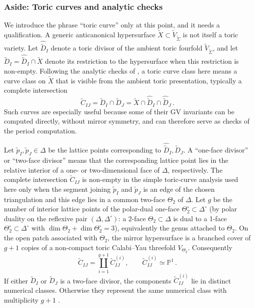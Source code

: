 \subsubsection*{Aside: Toric curves and analytic checks}



We introduce the phrase ``toric curve'' only at this point, and it
needs a qualification.  A generic anticanonical hypersurface
$\widetilde X\subset\widetilde V_{\widetilde\Sigma}$ is not itself a
toric variety.  Let $\widehat{\widetilde D}_I$ denote a toric divisor
of the ambient toric fourfold $\widetilde V_{\widetilde\Sigma}$, and
let $\widetilde D_I=\widehat{\widetilde D}_I\cap\widetilde X$ denote
its restriction to the hypersurface when this restriction is non-empty.
Following the analytic checks of
\cite{Braun:2017nhi,Demirtas:2023als}, a toric curve class here means
a curve class on $\widetilde X$ that is visible from the ambient toric
presentation, typically a complete intersection
\begin{equation}
    \widetilde C_{IJ}=\widetilde D_I\cap \widetilde D_J
      =
      \widetilde X\cap \widehat{\widetilde D}_I
      \cap \widehat{\widetilde D}_J\, .
\end{equation}
Such curves are especially useful because some of their GV invariants
can be computed directly, without mirror symmetry, and can therefore
serve as checks of the period computation.

Let $\widetilde p_I,\widetilde p_J\in\Delta$ be the lattice points
corresponding to
$\widehat{\widetilde D}_I,\widehat{\widetilde D}_J$.  A
``one-face divisor'' or ``two-face divisor'' means that the
corresponding lattice point lies in the relative interior of a one- or
two-dimensional face of $\Delta$, respectively.  The complete
intersection $\widetilde C_{IJ}$ is non-empty in the simple
toric-curve analysis used here only when the segment joining
$\widetilde p_I$ and $\widetilde p_J$ is an edge of the chosen
triangulation and this edge lies in a common two-face $\Theta_2$ of
$\Delta$.  Let $g$ be the number of
interior lattice points
of the polar-dual one-face $\Theta_2^\circ\subset\Delta^\circ$
(by polar duality on the reflexive pair
$(\Delta,\Delta^\circ)$: a 2-face $\Theta_2\subset\Delta$ is dual to
a 1-face $\Theta_2^\circ\subset\Delta^\circ$ with
$\dim\Theta_2 + \dim\Theta_2^\circ = 3$),
equivalently the genus attached to $\Theta_2$.  On the open patch
associated with $\Theta_2$, the mirror hypersurface is a branched
cover of
$g+1$ copies of a non-compact toric Calabi--Yau threefold
$V_{\Theta_2}$.  Consequently
\begin{equation}
    \widetilde C_{IJ}
      =
      \coprod_{i=1}^{g+1} \widetilde C_{IJ}^{(i)},
    \qquad
    \widetilde C_{IJ}^{(i)}\simeq\mathbb{P}^1\, .
\end{equation}
If either $\widetilde D_I$ or $\widetilde D_J$ is a two-face divisor,
the components $\widetilde C_{IJ}^{(i)}$ lie in distinct numerical
classes.  Otherwise they represent the same numerical class with
multiplicity $g+1$
\cite{Braun:2017nhi,Demirtas:2023als}.

